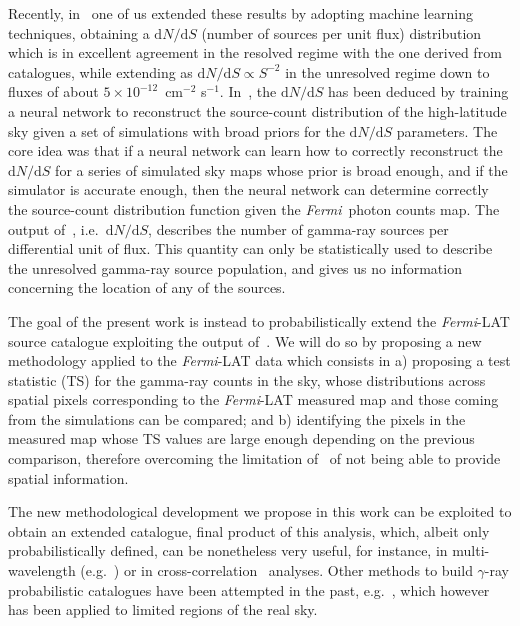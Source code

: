 \documentclass{article}
\def\d{\textrm{d}}
\def\dNdS{\textrm{d}N/\textrm{d}S}
\newcommand{\Fermi}{\textit{Fermi}}
\begin{document}
Recently, in~\cite{Amerio:2023uet} one of us extended these results by adopting machine learning techniques,  obtaining  a $\d N/\d S$ (number of sources per unit flux) distribution which  is in excellent agreement in the resolved regime with the one derived from catalogues, while extending as $\d N/\d S\propto S^{-2}$ in the unresolved regime down to fluxes of about $5\times 10^{-12}\,$ cm$^{-2}$ s$^{-1}$. 
%
In~\cite{Amerio:2023uet}, the $\dNdS$ has been deduced by training a neural network to reconstruct the source-count distribution of the high-latitude sky given a set of simulations with broad priors for the $\dNdS$ parameters. The core idea was that if a neural network can learn how to correctly reconstruct the $\dNdS$ for a series of simulated sky maps whose prior is broad enough, and if the simulator is accurate enough, then the neural network can determine correctly the source-count distribution function given the \Fermi~photon counts map. 
%
The output of~\cite{Amerio:2023uet}, i.e.~$\dNdS$, describes the number of gamma-ray sources per differential unit of flux. This quantity can only be statistically used to describe the unresolved gamma-ray source population, and gives us no information concerning the location of any of the sources.

The goal of the present work is instead to probabilistically extend the \Fermi-LAT source catalogue exploiting the output of~\cite{Amerio:2023uet}. We will do so by proposing a new methodology applied to the \Fermi-LAT data which consists in a) proposing a test statistic (TS) for the gamma-ray counts in the sky, whose distributions across spatial pixels corresponding to the \Fermi-LAT measured map and those coming from the simulations can be compared; and b) identifying the pixels in the measured map whose TS values are large enough depending on the previous comparison, therefore overcoming the limitation of~\cite{Amerio:2023uet} of not being able to provide spatial information.

The new methodological development we propose in this work can be exploited to obtain an extended catalogue, final product of this analysis, which, albeit only probabilistically defined, can be nonetheless very useful, for instance, in multi-wavelength (e.g.~\cite{2015ApJS..217....2M,Pena-Herazo:2021yrp,Pena-Herazo:2021ybj}) or in cross-correlation~\cite{2009ApJ...707L..56K,2010MNRAS.407..791G,Turley:2018biv,Li:2022vsb} analyses.   
%
Other methods to build $\gamma$-ray probabilistic catalogues have been attempted in the past, e.g.~\cite{Daylan:2016tia}, which however has been applied to limited regions of the real sky.
\end{document}
